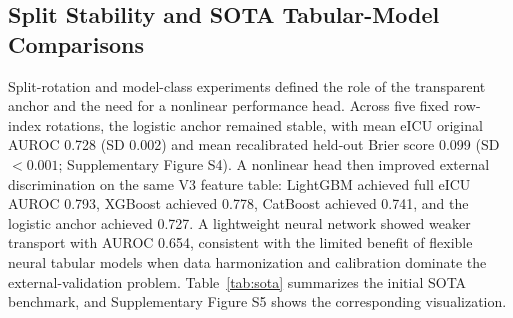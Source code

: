 \documentclass[utf8]{FrontiersinVancouver}
\begin{document}
\subsection{Split Stability and SOTA Tabular-Model Comparisons}
Split-rotation and model-class experiments defined the role of the transparent anchor and the need for a nonlinear performance head. Across five fixed row-index rotations, the logistic anchor remained stable, with mean eICU original AUROC 0.728 (SD 0.002) and mean recalibrated held-out Brier score 0.099 (SD $<0.001$; Supplementary Figure S4). A nonlinear head then improved external discrimination on the same V3 feature table: LightGBM achieved full eICU AUROC 0.793, XGBoost achieved 0.778, CatBoost achieved 0.741, and the logistic anchor achieved 0.727. A lightweight neural network showed weaker transport with AUROC 0.654, consistent with the limited benefit of flexible neural tabular models when data harmonization and calibration dominate the external-validation problem. Table~\ref{tab:sota} summarizes the initial SOTA benchmark, and Supplementary Figure S5 shows the corresponding visualization.

\begin{table}[htbp]
\centering
\caption{SOTA tabular-model comparison on the same MIMIC-IV development set and eICU-CRD external validation set. Bold values indicate the best value in each displayed metric column; lower Brier score and ECE are better.}
\label{tab:sota}
\end{table}
\end{document}
